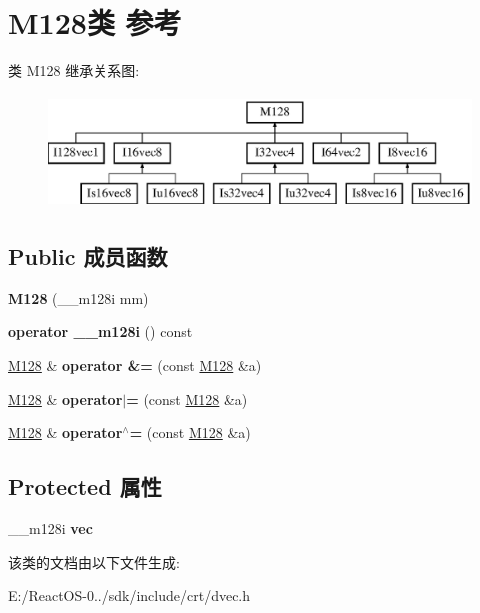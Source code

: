 \hypertarget{class_m128}{}\section{M128类 参考}
\label{class_m128}
类 M128 继承关系图\+:\begin{figure}[H]
\begin{center}
\leavevmode
\includegraphics[height=3.000000cm]{class_m128}
\end{center}
\end{figure}
\subsection*{Public 成员函数}
\begin{DoxyCompactItemize}
\item 
\mbox{\label{class_m128_afcfab250dcf08466acf8e8ccdfa9589e}} 
{\bfseries M128} (\+\_\+\+\_\+m128i mm)
\item 
\mbox{\label{class_m128_a2bf09bbac23d6f61885299c4178623f9}} 
{\bfseries operator \+\_\+\+\_\+m128i} () const
\item 
\mbox{\label{class_m128_a7a2378c1c906afff78a8a01eee319249}} 
\hyperlink{class_m128}{M128} \& {\bfseries operator \&=} (const \hyperlink{class_m128}{M128} \&a)
\item 
\mbox{\label{class_m128_aa68fba9f2b7fbfb596cf6d4d09c145ec}} 
\hyperlink{class_m128}{M128} \& {\bfseries operator$\vert$=} (const \hyperlink{class_m128}{M128} \&a)
\item 
\mbox{\label{class_m128_ae6d5825b68e7796c3c7e899729009ac2}} 
\hyperlink{class_m128}{M128} \& {\bfseries operator$^\wedge$=} (const \hyperlink{class_m128}{M128} \&a)
\end{DoxyCompactItemize}
\subsection*{Protected 属性}
\begin{DoxyCompactItemize}
\item 
\mbox{\label{class_m128_a0e199f01d2c54ba7918c36bb156024ee}} 
\+\_\+\+\_\+m128i {\bfseries vec}
\end{DoxyCompactItemize}


该类的文档由以下文件生成\+:\begin{DoxyCompactItemize}
\item 
E\+:/\+React\+O\+S-\/0../sdk/include/crt/dvec.\+h\end{DoxyCompactItemize}

